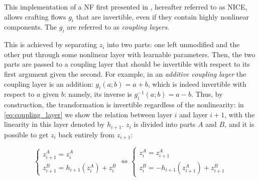 \documentclass[../main.tex]{subfiles}
\begin{document}
This implementation of a NF first presented in \cite{dinhNICE2015}, hereafter referred to as NICE, allows crafting flows $g_i$ that are invertible, even if they contain highly nonlinear components.
The $g_i$ are referred to as \emph{coupling layers}.

This is achieved by separating $z_i$ into two parts: one left unmodified and the other put through some nonlinear layer with learnable parameters.
Then, the two parts are passed to a coupling layer that should be invertible with respect to its first argument given the second.
For example, in an \emph{additive coupling layer} the coupling layer is an addition: $g_i(a; b) = a + b$, which is indeed invertible with respect to $a$ given $b$: namely, its inverse is $g_i^{-1}(a; b) = a - b$.
Thus, by construction, the transformation is invertible regardless of the nonlinearity: in \autoref{eq:coupling_layer} we show the relation between layer $i$ and layer $i+1$, with the linearity in this layer denoted by $h_{i+1}$. $z_i$ is divided into parts $A$ and $B$, and it is possible to get $z_i$ back entirely from $z_{i+1}$:

\begin{equation}
    \label{eq:coupling_layer}
    \begin{cases}
        z_{i+1}^A = z_i^A \\
        z_{i+1}^B = h_{i+1}(z_i^A) + z_i^B
    \end{cases}
    \Leftrightarrow
    \begin{cases}
        z_i^A = z_{i+1}^A \\
        z_i^B = -h_{i+1}(z_{i+1}^A) + z_{i+1}^B
    \end{cases}
\end{equation}
\end{document}

